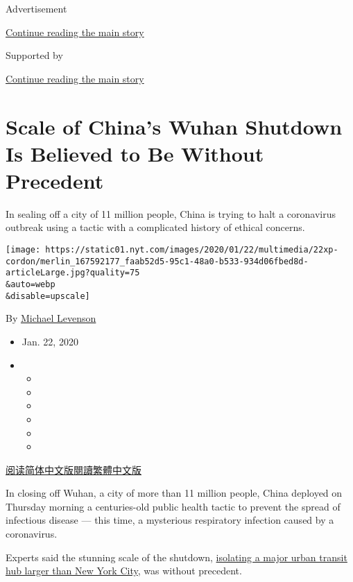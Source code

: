 Advertisement

\protect\hyperlink{after-top}{Continue reading the main story}

Supported by

\protect\hyperlink{after-sponsor}{Continue reading the main story}

\hypertarget{scale-of-chinas-wuhan-shutdown-is-believed-to-be-without-precedent}{%
\section{Scale of China's Wuhan Shutdown Is Believed to Be Without
Precedent}\label{scale-of-chinas-wuhan-shutdown-is-believed-to-be-without-precedent}}

In sealing off a city of 11 million people, China is trying to halt a
coronavirus outbreak using a tactic with a complicated history of
ethical concerns.

\texttt{[image: https://static01.nyt.com/images/2020/01/22/multimedia/22xp-cordon/merlin\_167592177\_faab52d5-95c1-48a0-b533-934d06fbed8d-articleLarge.jpg?quality=75\\\&auto=webp\\\&disable=upscale]}

By \href{https://www.nytimes.com/by/michael-levenson}{Michael Levenson}

\begin{itemize}
\item
  Jan. 22, 2020
\item
  \begin{itemize}
  \item
  \item
  \item
  \item
  \item
  \item
  \end{itemize}
\end{itemize}

\href{https://cn.nytimes.com/china/20200123/coronavirus-quarantines-history/}{阅读简体中文版}\href{https://cn.nytimes.com/china/20200123/coronavirus-quarantines-history/zh-hant/}{閱讀繁體中文版}

In closing off Wuhan, a city of more than 11 million people, China
deployed on Thursday morning a centuries-old public health tactic to
prevent the spread of infectious disease --- this time, a mysterious
respiratory infection caused by a coronavirus.

Experts said the stunning scale of the shutdown,
\href{https://www.nytimes.com/2020/01/22/world/asia/china-coronavirus-travel.html}{isolating
a major urban transit hub larger than New York City}, was without
precedent.

